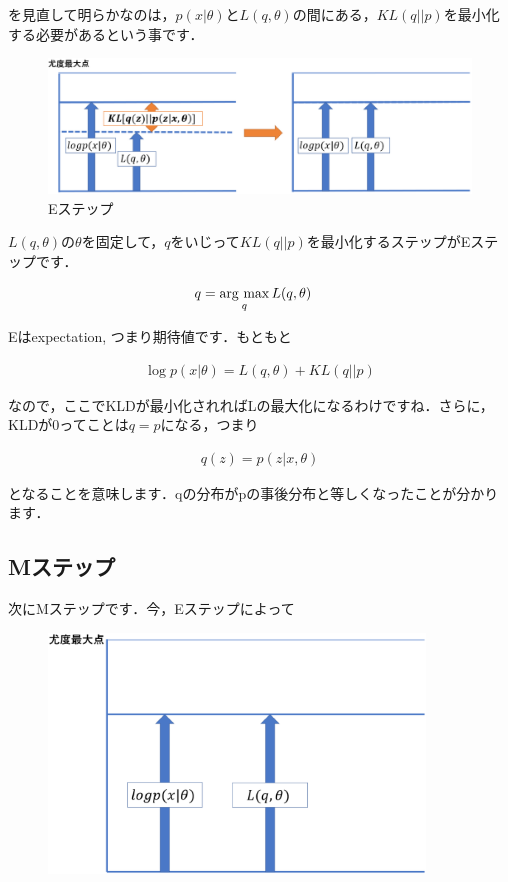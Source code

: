 \documentclass[11pt,a4paper]{ujreport}
\newcommand{\argmax}{\mathop{\rm arg~max}\limits}
\begin{document}
を見直して明らかなのは，$p(x|\theta)$と$L(q,\theta)$の間にある，$KL(q||p)$を最小化する必要があるという事です．

\begin{figure}[H]
  \label{im:em2}
  \centering
  \includegraphics[width=15cm]{../figures/em2.eps}
  \caption{Eステップ}
\end{figure}

$L(q,\theta)$の$\theta$を固定して，$q$をいじって$KL(q||p)$を最小化するステップがEステップです．

\begin{align}
  q &= \argmax_{q}L(q,\theta)
\end{align}

Eはexpectation, つまり期待値です．もともと

\begin{align}
  \log p(x|\theta) = L(q,\theta) + KL(q||p)\nonumber
\end{align}

なので，ここでKLDが最小化されればLの最大化になるわけですね．さらに，KLDが0ってことは$q=p$になる，つまり

\begin{align}
  \label{eq:e-step}
  q(z) = p(z|x,\theta)\nonumber
\end{align}

となることを意味します．qの分布がpの事後分布と等しくなったことが分かります．\\

\subsection{Mステップ}
次にMステップです．今，Eステップによって


\begin{figure}[H]
  \centering
  \includegraphics[width=10cm]{../figures/em3.eps}
\end{figure}
\end{document}

